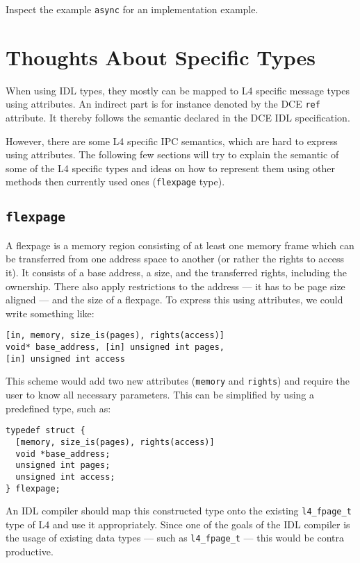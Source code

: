 Inspect the example \verb|async| for an implementation example.

\section{Thoughts About \dice{} Specific Types}

When using IDL types, they mostly can be mapped to L4 specific message types
using attributes. An indirect part is for instance denoted by the DCE
\verb|ref| attribute. It thereby follows the semantic declared in the DCE IDL
specification.

However, there are some L4 specific IPC semantics, which are hard to express
using attributes. The following few sections will try to explain the semantic
of some of the L4 specific types and ideas on how to represent them using
other methods then currently used ones ({\tt flexpage} type).

\subsection{\tt flexpage}
\label{sec:flexpage}

A flexpage is a memory region consisting of at least one memory frame which
can be transferred from one address space to another (or rather the rights to
access it). It consists of a base address, a size, and the transferred rights,
including the ownership. There also apply restrictions to the address --- it
has to be page size aligned --- and the size of a flexpage.  To express this
using attributes, we could write something like: 

\begin{verbatim} 
[in, memory, size_is(pages), rights(access)] 
void* base_address, [in] unsigned int pages,
[in] unsigned int access 
\end{verbatim} 

This scheme would add two new attributes (\verb|memory| and \verb|rights|) and
require the user to know all necessary parameters. This can be simplified by
using a predefined type, such as: 

\begin{verbatim} 
typedef struct { 
  [memory, size_is(pages), rights(access)] 
  void *base_address; 
  unsigned int pages;
  unsigned int access; 
} flexpage; 
\end{verbatim} 

An IDL compiler should map this constructed type onto the existing
\verb|l4_fpage_t| type of L4 and use it appropriately.  Since one of the goals
of the IDL compiler is the usage of existing data types --- such as
\verb|l4_fpage_t| --- this would be contra productive.

